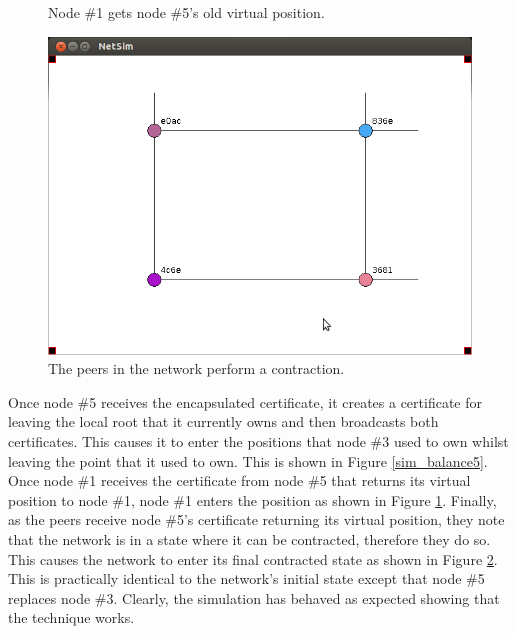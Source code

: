 \documentclass[ %
                    author={Luke Murray},
                supervisor={Dr. Simon Hollis},
                     title={Shadow Peer-to-Peer Networks},
                  subtitle={},
                    degree={MEng},
                      year={2013} ]{thesis}
\begin{document}
\begin{figure}[h]
\begin{minipage}[b]{0.45\linewidth}
        \caption{Node \#1 gets node \#5's old virtual position.}
        \label{sim_balance6}
    \end{minipage}
\end{figure}
\begin{figure}[h]
    \centering
    \begin{minipage}[b]{0.45\linewidth}
        \centering
        \includegraphics[width=\linewidth]{sim_pics/balance_10.png}
        \caption{The peers in the network perform a contraction.}
        \label{sim_balance7}
    \end{minipage}
\end{figure}

Once node \#5 receives the encapsulated certificate, it creates a certificate for leaving the local root that it currently owns and then broadcasts both certificates. This causes it to enter the positions that node \#3 used to own whilst leaving the point that it used to own. This is shown in Figure \ref{sim_balance5}. Once node \#1 receives the certificate from node \#5 that returns its virtual position to node \#1, node \#1 enters the position as shown in Figure \ref{sim_balance6}. Finally, as the peers receive node \#5's certificate returning its virtual position, they note that the network is in a state where it can be contracted, therefore they do so. This causes the network to enter its final contracted state as shown in Figure \ref{sim_balance7}. This is practically identical to the network's initial state except that node \#5 replaces node \#3. Clearly, the simulation has behaved as expected showing that the technique works.
\end{document}

